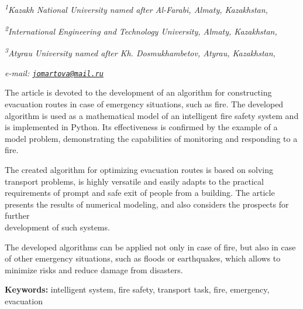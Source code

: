 \begin{affiliation}
\emph{\textsuperscript{1}Kazakh National University named after Al-Farabi, Almaty, Kazakhstan,}

\emph{\textsuperscript{2}International Engineering and Technology University, Almaty, Kazakhstan,}

\emph{\textsuperscript{3}Atyrau University named after Kh. Dosmukhambetov, Atyrau, Kazakhstan,}

\emph{e-mail: \href{mailto:jomartova@mail.ru}{\nolinkurl{jomartova@mail.ru}}}
\end{affiliation}

The article is devoted to the development of an algorithm for
constructing evacuation routes in case of emergency situations, such as
fire. The developed algorithm is used as a mathematical model of an
intelligent fire safety system and is implemented in Python. Its
effectiveness is confirmed by the example of a model problem,
demonstrating the capabilities of monitoring and responding to a fire.

The created algorithm for optimizing evacuation routes is based on
solving transport problems, is highly versatile and easily adapts to the
practical requirements of prompt and safe exit of people from a
building. The article presents the results of numerical modeling, and
also considers the prospects for further \\development of such systems.

The developed algorithms can be applied not only in case of fire, but
also in case of other emergency situations, such as floods or
earthquakes, which allows to minimize risks and reduce damage from
disasters.

{\bfseries Keywords:} intelligent system, fire safety, transport task, fire,
emergency, evacuation

